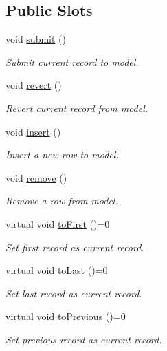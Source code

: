 \subsection*{Public Slots}
\begin{DoxyCompactItemize}
\item 
void \hyperlink{classmdt_abstract_sql_widget_a6678c45b0d46eb163f5b09d79ed001b5}{submit} ()
\begin{DoxyCompactList}\small\item\em Submit current record to model. \end{DoxyCompactList}\item 
void \hyperlink{classmdt_abstract_sql_widget_a3108b336f4c832cb0a5b3a830fff9ce0}{revert} ()
\begin{DoxyCompactList}\small\item\em Revert current record from model. \end{DoxyCompactList}\item 
void \hyperlink{classmdt_abstract_sql_widget_a850df045ea95b8c15ddd95ae771ef785}{insert} ()
\begin{DoxyCompactList}\small\item\em Insert a new row to model. \end{DoxyCompactList}\item 
void \hyperlink{classmdt_abstract_sql_widget_a748f85ff383d3f11fda4db7f931edb1c}{remove} ()
\begin{DoxyCompactList}\small\item\em Remove a row from model. \end{DoxyCompactList}\item 
virtual void \hyperlink{classmdt_abstract_sql_widget_aaa27731864dbb9123ec6765dd21feb7f}{toFirst} ()=0
\begin{DoxyCompactList}\small\item\em Set first record as current record. \end{DoxyCompactList}\item 
virtual void \hyperlink{classmdt_abstract_sql_widget_a681cc6234976eaa2f0e158248569b502}{toLast} ()=0
\begin{DoxyCompactList}\small\item\em Set last record as current record. \end{DoxyCompactList}\item 
virtual void \hyperlink{classmdt_abstract_sql_widget_a342b13a8258536d228f8522dae2b9df7}{toPrevious} ()=0
\begin{DoxyCompactList}\small\item\em Set previous record as current record. \end{DoxyCompactList}\item 

\end{DoxyCompactItemize}
